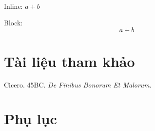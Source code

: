 \documentclass[14pt,oneside]{scrbook}
\newlength{\cslhangindent}
\newenvironment{CSLReferences}[2] %
{\begin{list}{}{%
\setlength{\itemindent}{0pt}
\setlength{\leftmargin}{0pt}
\setlength{\parsep}{0pt}
\ifodd #1
\setlength{\leftmargin}{\cslhangindent}
\setlength{\itemindent}{-1\cslhangindent}
\fi
\setlength{\itemsep}{#2\baselineskip}}}
{\end{list}}
\begin{document}
Inline: \(a+b\)

Block: \[a+b\]

\chapter{Tài liệu tham khảo}\label{tuxe0i-liux1ec7u-tham-khux1ea3o}

\label{refs-main}
\begin{CSLReferences}{1}{0}
Cicero. 45BC. \emph{De Finibus Bonorum Et Malorum}.

\end{CSLReferences}

\chapter{Phụ lục}\label{phux1ee5-lux1ee5c}
\backmatter
\end{document}
